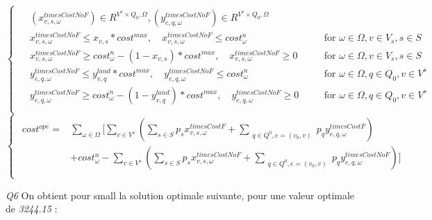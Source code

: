 \documentclass[a4paper,12pt]{article}
\begin{document}
    \begin{equation}
        \begin{cases}
            \begin{alignedat}{2}
                & (x_{v,s,\omega}^{timesCostNoF}) \in R^{V^{s} \times Q_{0}, \Omega}, (y_{e,q,\omega}^{timesCostNoF}) \in R^{V^{s} \times Q_{0}, \Omega} \\
                & x_{v,s,\omega}^{timesCostNoF} \leq x_{v,s}*cost^{max}, \quad x_{v,s,\omega}^{timesCostNoF} \leq cost_{\omega} ^n && \text{for } \omega \in\Omega, v \in V_{s}, s \in S\\
                & x_{v,s,\omega}^{timesCostNoF} \geq cost_{\omega} ^n - (1-x_{v,s})*cost^{max}, \quad x_{v,s,\omega}^{timesCostNoF} \geq 0 && \text{for } \omega \in\Omega, v \in V_{s}, s \in S\\
                & y_{e,q,\omega}^{timesCostNoF} \leq y_{v,q}^{land} * cost^{max}, \quad y_{e,q,\omega}^{timesCostNoF} \leq cost_{\omega} ^n \quad && \text{for } \omega \in \Omega, q \in Q_{0}, v \in V^{s} \\
                & y_{e,q,\omega}^{timesCostNoF} \geq cost_{\omega} ^n -(1-y_{v,q}^{land})*cost^{max}, \quad  y_{e,q,\omega}^{timesCostNoF} \geq 0 \quad && \text{for } \omega \in\Omega, q \in Q_{0}, v \in V^{s}\\
            \end{alignedat}
        \end{cases}
    \end{equation}
    \begin{equation}
        \begin{cases}
            \begin{alignedat}{2}
                cost^{ope} = & \sum_{\omega \in \Omega} \lbrack \sum_{v \in V^s} ( \sum_{s \in S} p_s x_{v,s,\omega}^{timesCostF} + \sum_{\substack{q \in Q^0, e = (v_0, v)}} p_q y_{e,q,\omega}^{timesCostF} ) \\
                &+ cost^n_{\omega} - \sum_{v \in V^s} ( \sum_{s \in S} p_s x_{v,s,\omega}^{timesCostNoF} + \sum_{\substack{q \in Q^{0}, e = (v_0, v)}} p_q y_{e,q,\omega}^{timesCostNoF} ) \rbrack \\ 
            \end{alignedat}
        \end{cases}
    \end{equation}

\textit{Q6}
On obtient pour small la solution optimale suivante, pour une valeur optimale de \textit{3244.15} :
\end{document}
